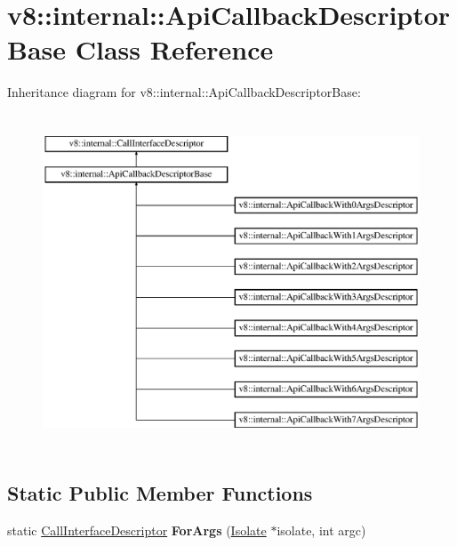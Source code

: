 \hypertarget{classv8_1_1internal_1_1_api_callback_descriptor_base}{}\section{v8\+:\+:internal\+:\+:Api\+Callback\+Descriptor\+Base Class Reference}
\label{classv8_1_1internal_1_1_api_callback_descriptor_base}
Inheritance diagram for v8\+:\+:internal\+:\+:Api\+Callback\+Descriptor\+Base\+:\begin{figure}[H]
\begin{center}
\leavevmode
\includegraphics[height=10.000000cm]{classv8_1_1internal_1_1_api_callback_descriptor_base}
\end{center}
\end{figure}
\subsection*{Static Public Member Functions}
\begin{DoxyCompactItemize}
\item 
static \hyperlink{classv8_1_1internal_1_1_call_interface_descriptor}{Call\+Interface\+Descriptor} {\bfseries For\+Args} (\hyperlink{classv8_1_1internal_1_1_isolate}{Isolate} $\ast$isolate, int argc)\hypertarget{classv8_1_1internal_1_1_api_callback_descriptor_base_a607ad9694235e6b4950834330bdfe132}{}\label{classv8_1_1internal_1_1_api_callback_descriptor_base_a607ad9694235e6b4950834330bdfe132}

\end{DoxyCompactItemize}
